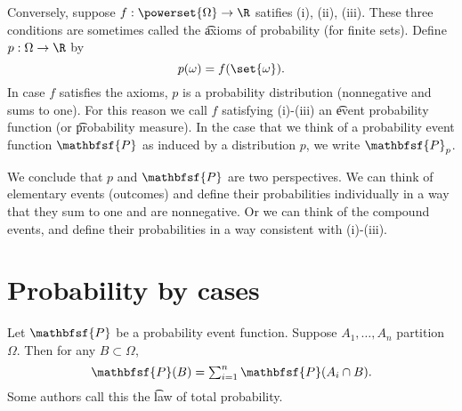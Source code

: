 Conversely, suppose $f: \powerset{\Omega } \to \R $ satifies (i), (ii), (iii).
These three conditions are sometimes called the \t{axioms of probability} (for finite sets).
Define $p: \Omega  \to \R $ by
  \[
p(\omega ) = f(\set{\omega }).
  \]
In case $f$ satisfies the axioms, $p$ is a probability distribution (nonnegative and sums to one).
For this reason we call $f$ satisfying (i)-(iii) an \t{event probability function} (or \t{probability measure}).
In the case that we think of a probability event function $\mathbfsf{P} $ as induced by a distribution $p$, we write $\mathbfsf{P} _p$.

We conclude that $p$ and $\mathbfsf{P} $ are two perspectives.
We can think of elementary events (outcomes) and define their probabilities individually in a way that they sum to one and are nonnegative.
Or we can think of the compound events, and define their probabilities in a way consistent with (i)-(iii).

\section{Probability by cases}

Let $\mathbfsf{P} $ be a probability event function.
Suppose $A_1, \dots , A_n$ partition $\Omega $.
Then for any $B \subset \Omega $,
  \[
\textstyle
\mathbfsf{P} (B) = \sum_{i = 1}^{n} \mathbfsf{P} (A_i \cap B).
  \]
Some authors call this the \t{law of total probability}.
